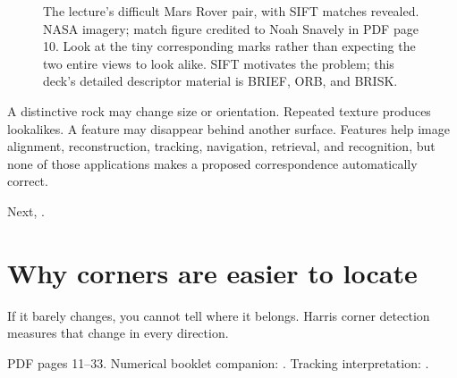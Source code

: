\documentclass[letterpaper,11pt,english,openany,oneside]{jupyterBook}
\begin{document}
\begin{figure}[H]
\centering
\capstart

\noindent{}
\caption{The lecture’s difficult Mars Rover pair, with SIFT matches revealed. NASA imagery; match figure credited to Noah Snavely in PDF page 10. Look at the tiny corresponding marks rather than expecting the two entire views to look alike. SIFT motivates the problem; this deck’s detailed descriptor material is BRIEF, ORB, and BRISK.}\label{\detokenize{lectures/lecture05/features:fig-lec05-mars}}\end{figure}

\sphinxAtStartPar
{} A distinctive rock may change size or orientation. Repeated texture produces look\sphinxhyphen{}alikes. A feature may disappear behind another surface. Features help image alignment, reconstruction, tracking, navigation, retrieval, and recognition, but none of those applications makes a proposed correspondence automatically correct.

\sphinxAtStartPar
Next, {\hyperref[\detokenize{lectures/lecture05/corners::doc}]{}}.

\ignorespaces
{}\ignorespaces
\sphinxstepscope


\section{Why corners are easier to locate}
\label{\detokenize{lectures/lecture05/corners:why-corners-are-easier-to-locate}}\label{\detokenize{lectures/lecture05/corners:lec05-corners}}\label{\detokenize{lectures/lecture05/corners::doc}}
\sphinxAtStartPar
{} If it barely changes, you cannot tell where it belongs. Harris corner detection measures that change in every direction.

\sphinxAtStartPar
{} PDF pages 11–33. Numerical booklet companion: {\hyperref[\detokenize{lectures/lecture05/quiz-workbook:quiz-a2-q1}]{}}. Tracking interpretation: {\hyperref[\detokenize{lectures/lecture05/quiz-workbook:quiz-13-q1}]{}}.
\end{document}
